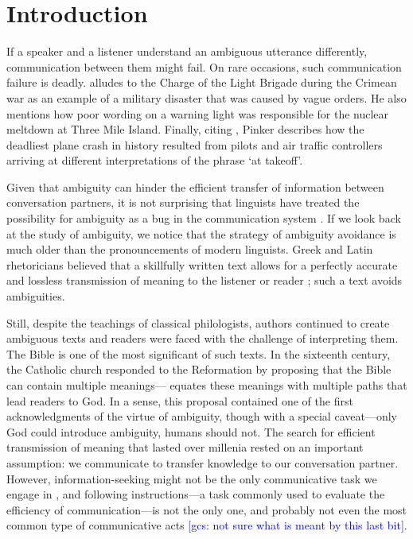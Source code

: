 \documentclass[10pt,a4paper]{article}
\newcommand{\gcs}[1]{\textcolor{blue}{[gcs: #1]}}
\begin{document}
\section{Introduction}

If a speaker and a listener understand an ambiguous utterance differently, communication between them might fail. On rare occasions, such communication failure is deadly.  alludes to the Charge of the Light Brigade during the Crimean war as an example of a military disaster that was caused by vague orders. He also mentions how poor wording on a warning light was responsible for the nuclear meltdown at Three Mile Island. Finally, citing , Pinker describes how the deadliest plane crash in history resulted from pilots and air traffic controllers arriving at different interpretations of the phrase `at takeoff'.

Given that ambiguity can hinder the efficient transfer of information between conversation partners, it is not surprising that linguists have treated the possibility for ambiguity as a bug in the communication system \cite{grice1975,chomsky2002minimalism}.
If we look back at the study of ambiguity, we notice that the strategy of ambiguity avoidance is much older than the pronouncements of modern linguists. 
Greek and Latin rhetoricians believed that a skillfully written text allows for a perfectly accurate and lossless transmission of meaning to the listener or reader \cite{ossarichardson2019}; such a text avoids ambiguities.

Still, despite the teachings of classical philologists, authors continued to  create ambiguous texts and readers were faced with the challenge of interpreting them. The Bible is one of the most significant of such texts. In the sixteenth century, the Catholic church responded to the Reformation by proposing that the Bible can contain multiple meanings--- equates these meanings with multiple paths that lead readers to God. In a sense, this proposal contained one of the first acknowledgments of the virtue of ambiguity, though with a  special caveat---only God could introduce ambiguity, humans should not. The search for efficient transmission of meaning that lasted over millenia rested on an important assumption: we communicate to transfer knowledge to our conversation partner. However, information-seeking might not be the only communicative task we engage in \cite{markova1995preface}, and following instructions---a task commonly used to evaluate the efficiency of communication---is not the only one, and probably not even the most common type of communicative acts \cite{foppa1995mutual} \gcs{not sure what is meant by this last bit}. 
\end{document}
